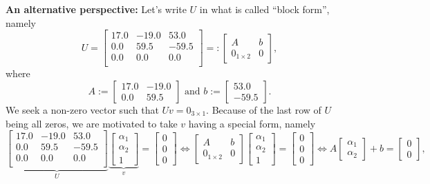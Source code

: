\textbf{An alternative perspective:}  Let's write $U$ in what is called ``block form'', namely
 $$ U=\left[
\begin{array}{rrr}
17.0 & -19.0 & 53.0 \\
0.0 & 59.5 & -59.5 \\
0.0 & 0.0 & 0.0 \\
\end{array}
\right] =:\left[
\begin{array}{cc}
A & b \\
0_{1 \times 2} & 0
\end{array}
\right],$$
where 
 $$ A:=\left[
\begin{array}{rr}
17.0 & -19.0 \\
0.0 & 59.5 
\end{array}
\right] \text{ and } b:=\left[
\begin{array}{r}
53.0 \\
-59.5
\end{array}
\right].$$
We seek a non-zero vector such that $U v = 0_{3 \times 1}$. Because of the last row of $U$ being all zeros, we are motivated to take $v$ having a special form, namely
$$  \underbrace{ \left[
\begin{array}{rrr}
17.0 & -19.0 & 53.0 \\
0.0 & 59.5 & -59.5 \\
0.0 & 0.0 & 0.0 \\
\end{array}
\right]}_{U} \underbrace{\left[
\begin{array}{c}
\alpha_1 \\
\alpha_2 \\
1
\end{array}
\right]}_{v} = \left[
\begin{array}{r}
0 \\
0\\
0
\end{array}
\right] \iff \left[
\begin{array}{cc}
A & b \\
0_{1 \times 2} & 0
\end{array}
\right] \left[
\begin{array}{c}
\alpha_1 \\
\alpha_2 \\
1
\end{array}
\right] = \left[
\begin{array}{r}
0 \\
0\\
0
\end{array}
\right] \iff A  \left[
\begin{array}{c}
\alpha_1 \\
\alpha_2 
\end{array}
\right]  + b = \left[
\begin{array}{r}
0 \\
0
\end{array}
\right],$$
